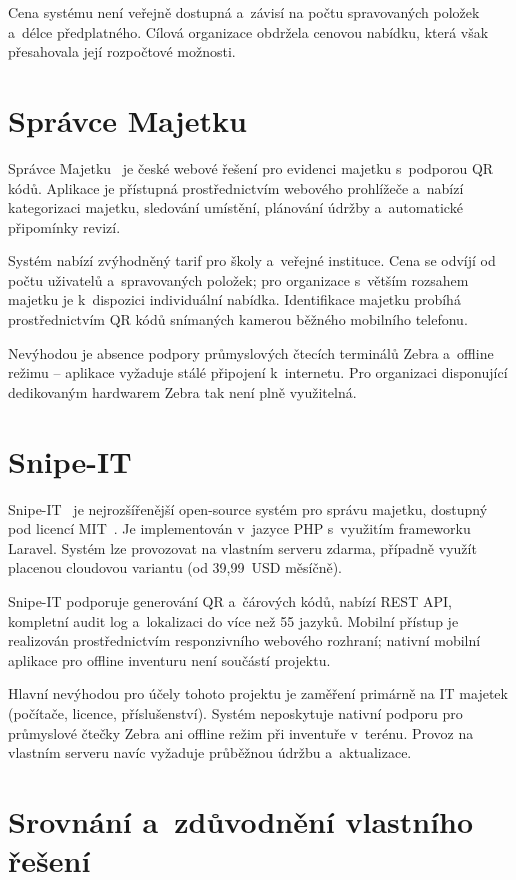 Cena systému není veřejně dostupná a~závisí na počtu spravovaných položek a~délce předplatného. Cílová organizace obdržela cenovou nabídku, která však přesahovala její rozpočtové možnosti.

\section{Správce Majetku}

Správce Majetku~\cite{spravce-majetku} je české webové řešení pro evidenci majetku s~podporou QR kódů. Aplikace je přístupná prostřednictvím webového prohlížeče a~nabízí kategorizaci majetku, sledování umístění, plánování údržby a~automatické připomínky revizí.

Systém nabízí zvýhodněný tarif pro školy a~veřejné instituce. Cena se odvíjí od počtu uživatelů a~spravovaných položek; pro organizace s~větším rozsahem majetku je k~dispozici individuální nabídka. Identifikace majetku probíhá prostřednictvím QR kódů snímaných kamerou běžného mobilního telefonu.

Nevýhodou je absence podpory průmyslových čtecích terminálů Zebra a~offline režimu -- aplikace vyžaduje stálé připojení k~internetu. Pro organizaci disponující dedikovaným hardwarem Zebra tak není plně využitelná.

\section{Snipe-IT}

Snipe-IT~\cite{snipeit} je nejrozšířenější open-source systém pro správu majetku, dostupný pod licencí MIT~\cite{snipeit-github}. Je implementován v~jazyce PHP s~využitím frameworku Laravel. Systém lze provozovat na vlastním serveru zdarma, případně využít placenou cloudovou variantu (od 39,99~USD měsíčně).

Snipe-IT podporuje generování QR a~čárových kódů, nabízí REST API, kompletní audit log a~lokalizaci do více než 55 jazyků. Mobilní přístup je realizován prostřednictvím responzivního webového rozhraní; nativní mobilní aplikace pro offline inventuru není součástí projektu.

Hlavní nevýhodou pro účely tohoto projektu je zaměření primárně na IT majetek (počítače, licence, příslušenství). Systém neposkytuje nativní podporu pro průmyslové čtečky Zebra ani offline režim při inventuře v~terénu. Provoz na vlastním serveru navíc vyžaduje průběžnou údržbu a~aktualizace.

\section{Srovnání a~zdůvodnění vlastního řešení}

